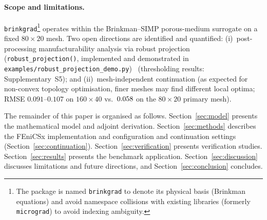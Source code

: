 \paragraph{Scope and limitations.}
\texttt{brinkgrad}\footnote{The package is named \texttt{brinkgrad}
to denote its physical basis (Brinkman equations)
and avoid namespace collisions with existing libraries
(formerly \texttt{micrograd}) to avoid indexing ambiguity.}
operates within the Brinkman--SIMP porous-medium surrogate
on a fixed $80\times20$ mesh.
Two open directions are identified and quantified:
(i)~post-processing manufacturability analysis via robust projection
(\texttt{robust\_projection()}, implemented and demonstrated
in \texttt{examples/robust\_projection\_demo.py})~\cite{wang2011}
(thresholding results: Supplementary~S5); and
(ii)~mesh-independent continuation
(as expected for non-convex topology optimisation,
          finer meshes may find different local optima;
RMSE $0.091$--$0.107$ on $160\times40$
vs.\ $0.058$ on the $80\times20$ primary mesh).

The remainder of this paper is organised as follows.
Section~\ref{sec:model} presents the mathematical model and adjoint
derivation.
Section~\ref{sec:methods} describes the FEniCSx implementation and
configuration and continuation settings
(Section~\ref{sec:continuation}).
Section~\ref{sec:verification} presents verification studies.
Section~\ref{sec:results} presents the benchmark application.
Section~\ref{sec:discussion} discusses limitations and future directions,
and Section~\ref{sec:conclusion} concludes.